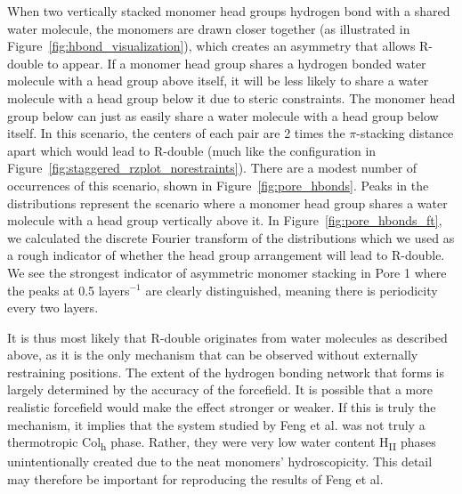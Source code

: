 \documentclass[journal=jpcbfk,manuscript=article]{achemso}
\begin{document}
  When two vertically stacked monomer head groups hydrogen bond with a shared water 
  molecule, the monomers are drawn closer together (as illustrated in 
  Figure~\ref{fig:hbond_visualization}), which creates an asymmetry that allows 
  R-double to appear. If a monomer head group shares a hydrogen bonded water molecule
  with a head group above itself, it will be less likely to share a water molecule 
  with a head group below it due to steric constraints. The monomer head group below
  can just as easily share a water molecule with a head group below itself. In this scenario,
  the centers of each pair are 2 times the $\pi$-stacking distance apart which would
  lead to R-double (much like the configuration in Figure~\ref{fig:staggered_rzplot_norestraints}). There are
  a modest number of occurrences of this scenario, shown in Figure~\ref{fig:pore_hbonds}. 
  Peaks in the distributions represent the scenario where a monomer head group shares a 
  water molecule with a head group vertically above it. In Figure~\ref{fig:pore_hbonds_ft},
  we calculated the discrete Fourier transform of the distributions which we used as a rough 
  indicator of whether the head group arrangement will lead to R-double. We see the 
  strongest indicator of asymmetric monomer stacking in Pore 1 where the peaks at 0.5
  layers$^{-1}$ are clearly distinguished, meaning there is periodicity every two layers.
  
  It is thus most likely that R-double originates from water molecules as described above, as it is the 
  only mechanism that can be observed without externally restraining positions. The extent of the hydrogen
  bonding network that forms is largely determined by the accuracy of the forcefield. It is 
  possible that a more realistic forcefield would make the effect stronger or weaker. If 
  this is truly the mechanism, it implies that the system studied by Feng et 
  al.\cite{feng_scalable_2014,feng_thin_2016} was not truly a thermotropic Col\textsubscript{h}
  phase. Rather, they were very low water content H\textsubscript{II} phases unintentionally
  created due to the neat monomers' hydroscopicity. This detail may therefore be important for reproducing
  the results of Feng et al.
\end{document}
